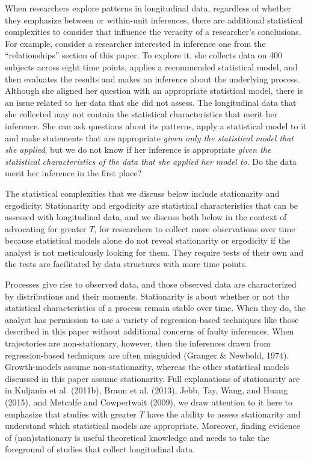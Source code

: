 \documentclass[english,,man]{apa6}
\theoremstyle{definition}
\theoremstyle{definition}
\theoremstyle{definition}
\theoremstyle{remark}
\begin{document}
When researchers explore patterns in longitudinal data, regardless of
whether they emphasize between or within-unit inferences, there are
additional statistical complexities to consider that influence the
veracity of a researcher's conclusions. For example, consider a
researcher interested in inference one from the \enquote{relationships}
section of this paper. To explore it, she collects data on 400 subjects
across eight time points, applies a recommended statistical model, and
then evaluates the results and makes an inference about the underlying
process. Although she aligned her question with an appropriate
statistical model, there is an issue related to her data that she did
not assess. The longitudinal data that she collected may not contain the
statistical characteristics that merit her inference. She can ask
questions about its patterns, apply a statistical model to it and make
statements that are appropriate \emph{given only the statistical model
that she applied}, but we do not know if her inference is appropriate
\emph{given the statistical characteristics of the data that she applied
her model to}. Do the data merit her inference in the first place?

The statistical complexities that we discuss below include stationarity
and ergodicity. Stationarity and ergodicity are statistical
characteristics that can be assessed with longitudinal data, and we
discuss both below in the context of advocating for greater \(T\), for
researchers to collect more observations over time because statistical
models alone do not reveal stationarity or ergodicity if the analyst is
not meticulously looking for them. They require tests of their own and
the tests are facilitated by data structures with more time points.

Processes give rise to observed data, and those observed data are
characterized by distributions and their moments. Stationarity is about
whether or not the statistical characteristics of a process remain
stable over time. When they do, the analyst has permission to use a
variety of regression-based techniques like those described in this
paper without additional concerns of faulty inferences. When
trajectories are non-stationary, however, then the inferences drawn from
regression-based techniques are often misguided (Granger \& Newbold,
1974). Growth-models assume non-stationarity, whereas the other
statistical models discussed in this paper assume stationarity. Full
explanations of stationarity are in Kuljanin et al. (2011b), Braun et
al. (2013), Jebb, Tay, Wang, and Huang (2015), and Metcalfe and
Cowpertwait (2009), we draw attention to it here to emphasize that
studies with greater \(T\) have the ability to assess stationarity and
understand which statistical models are appropriate. Moreover, finding
evidence of (non)stationary is useful theoretical knowledge and needs to
take the foreground of studies that collect longitudinal data.
\end{document}

